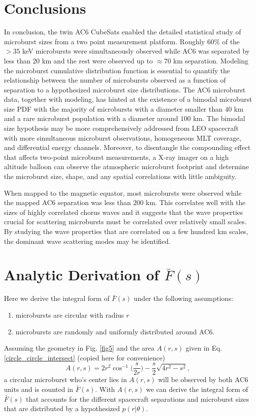 \documentclass[draft]{agujournal2019}
\begin{document}
\section{Conclusions}
In conclusion, the twin AC6 CubeSats enabled the detailed statistical study of microburst sizes from a two point measurement platform. Roughly $60 \%$ of the $> 35$ keV microbursts were simultaneously observed while AC6 was separated by less than $20$ km and the rest were observed up to $\approx 70$ km separation. Modeling the microburst cumulative distribution function is essential to quantify the relationship between the number of microbursts observed as a function of separation to a hypothesized microburst size distributions. The AC6 microburst data, together with modeling, has hinted at the existence of a bimodal microburst size PDF with the majority of microbursts with a diameter smaller than $40$ km and a rare microburst population with a diameter around $100$ km. The bimodal size hypothesis may be more comprehensively addressed from LEO spacecraft with more simultaneous microburst observations, homogeneous MLT coverage, and differential energy channels. Moreover, to disentangle the compounding effect that affects two-point microburst measurements, a X-ray imager on a high altitude balloon can observe the atmospheric microburst footprint and determine the microburst size, shape, and any spatial correlations with little ambiguity. 

When mapped to the magnetic equator, most microbursts were observed while the mapped AC6 separation was less than $200$ km. This correlates well with the sizes of highly correlated chorus waves and it suggests that the wave properties crucial for scattering microbursts must be correlated over relatively small scales. By studying the wave properties that are correlated on a few hundred km scales, the dominant wave scattering modes may be identified.

\appendix
\section{Analytic Derivation of $\bar{F}(s)$} \label{appendixa}
Here we derive the integral form of $\bar{F}(s)$ under the following assumptions:

\begin{enumerate}
\item microbursts are circular with radius $r$
\item microbursts are randomly and uniformly distributed around AC6.
\end{enumerate} Assuming the geometry in Fig. \ref{fig5} and the area $A(r, s)$ given in Eq. \ref{circle_circle_intersect} (copied here for convenience)
\begin{equation}
A(r, s) = 2r^2 \cos^{-1}{\Big( \frac{s}{2r} \Big)} - \frac{s}{2} \sqrt{4r^2 - s^2},
\end{equation} a circular microburst who's center lies in $A(r, s)$ will be observed by both AC6 units and is counted in $\bar{F}(s)$. With $A(r, s)$ we can derive the integral form of $\bar{F}(s)$ that accounts for the different spacecraft separations and microburst sizes that are distributed by a hypothesized $p(r | \theta)$.
\end{document}

